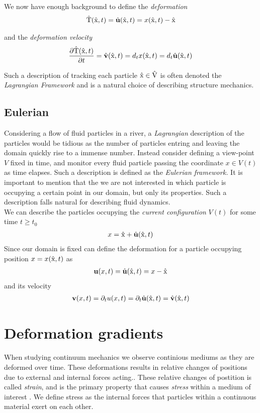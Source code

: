 We now have enough background to define the \textit{deformation} 
\begin{align}
\ha{T}(\ha{x}, t) = \hat{u}(\ha{x},t) = x(\ha{x},t) - \ha{x} 
\end{align}

and the \textit{deformation velocity}
\begin{align}
\pder{\ha{T}(\ha{x}, t)}{t} = \hat{v}(\ha{x},t) = d_t x(\ha{x},t) = d_t \hat{u}(\ha{x},t) 
\end{align}

Such a description of tracking each particle $\text{\^{x}} \in \text{\^{V}}$ is often denoted the \textit{Lagrangian Framework} and is a natural choice of describing structure mechanics.
\subsection{Eulerian}
Considering a flow of fluid particles in a river, a \textit{Lagrangian} description of the particles would be tidious as the number of particles entring and leaving the domain quickly rise to a immense number. 
Instead consider defining a view-point $V$ fixed in time, and monitor every fluid particle passing the coordinate $x \in V(t)$ as time elapses. Such a description is defined as the \textit{Eulerian framework.} 
It is important to mention that the we are not interested in which particle is occupying a certain point in our domain, but only its properties. Such a description falls natural for describing fluid dynamics. \\
We can describe the particles occupying the \textit{current configuration} $V(t)$ for some time $t \geq t_0$ 
\begin{align*}
x = \ha{x} + \hat{u}(\ha{x}, t)	
\end{align*}
Since our domain is fixed can define the deformation for a particle 
occupying position $x = x(\text{\^{x}},t)$ as
\begin{align*}
\textbf{u}(x, t) = \hat{u}(\ha{x}, t) = x - \ha{x}	\\
\end{align*}
and its velocity
\begin{align*}
\textbf{v}(x,t) = \partial_t u(x,t) = \partial_t \hat{u}(\ha{x},t) = \hat{v}(\ha{x},t)
\end{align*}

\section{Deformation gradients}
When studying continuum mechanics we observe continious mediums as they are deformed over time. These deformations
results in relative changes of positions due to external and internal forces acting.. These relative changes of postition is called
\textit{strain}, and is the primary property that causes \textit{stress} within a medium of interest \cite{Richter2016}. We define stress as the internal forces that particles within a continuous material exert on each other. \\

